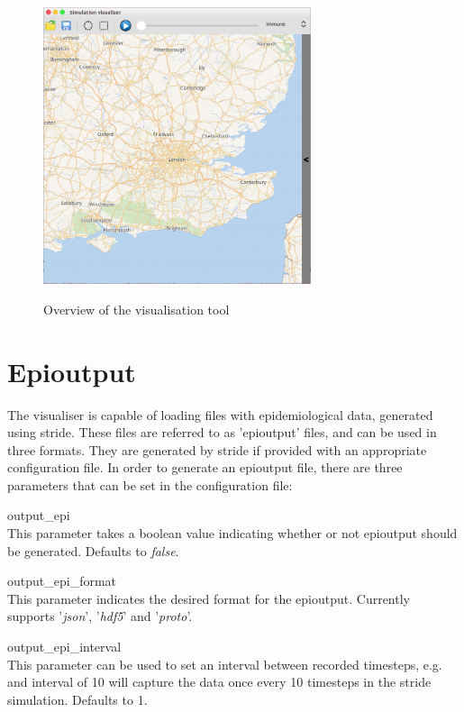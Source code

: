 \begin{figure}[H]
\centering
\includegraphics[width=0.7\textwidth,keepaspectratio]{images/overview.png}
\label{fig:screenshot_overview}
\caption{Overview of the visualisation tool}
\end{figure}

\section{Epioutput}
\label{section:epioutput}
The visualiser is capable of loading files with epidemiological data, generated using stride. These files are referred to as 'epioutput' files, and can be used in three formats. They are generated by stride if provided with an appropriate configuration file. In order to generate an epioutput file, there are three parameters that can be set in the configuration file:

\begin{compactdesc}
\item [output\_epi] \ \\
    This parameter takes a boolean value indicating whether or not epioutput should be generated. Defaults to \emph{false}.
\item [output\_epi\_format] \ \\
    This parameter indicates the desired format for the epioutput. Currently supports '\emph{json}', '\emph{hdf5}' and '\emph{proto}'.
\item [output\_epi\_interval] \ \\
    This parameter can be used to set an interval between recorded timesteps, e.g. and interval of 10 will capture the data once every 10 timesteps in the stride simulation. Defaults to 1.
\end{compactdesc}

